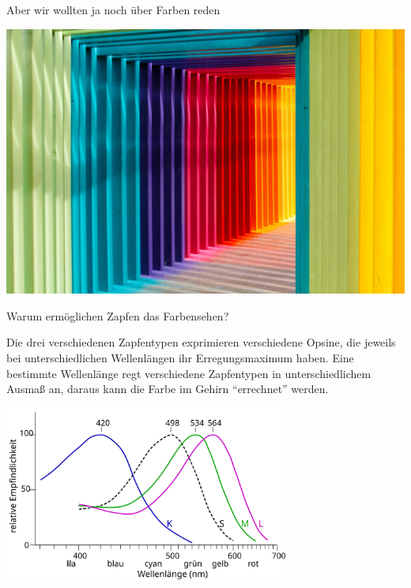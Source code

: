 \documentclass{beamer}
\begin{document}
\begin{frame}{Aber wir wollten ja noch über Farben reden}

\begin{center}
    \includegraphics[width=\textwidth]{robert-katzki-jbtfM0XBeRc-unsplash.jpg}
\end{center}
    
\end{frame}

\begin{frame}{Warum ermöglichen Zapfen das Farbensehen?}

Die drei verschiedenen Zapfentypen exprimieren verschiedene Opsine, die jeweils bei unterschiedlichen Wellenlängen ihr Erregungsmaximum haben. Eine bestimmte Wellenlänge regt verschiedene Zapfentypen in unterschiedlichem Ausmaß an, daraus kann die Farbe im Gehirn ``errechnet'' werden. 

\begin{center}
        \includegraphics[width=0.7\textwidth]{Cone-response-de.png}
    \end{center}
    
\end{frame}
\end{document}
